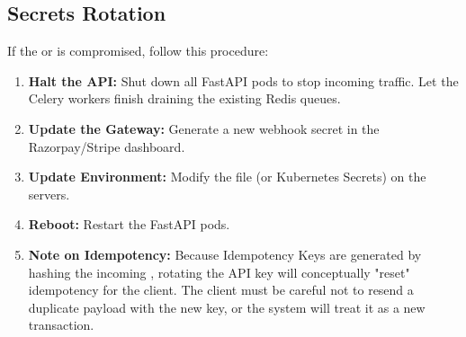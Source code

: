 \vspace{0.8cm}

\subsection{Secrets Rotation}

If the  or  is compromised, follow this procedure:
\begin{enumerate}
    \item \textbf{Halt the API:} Shut down all FastAPI pods to stop incoming traffic. Let the Celery workers finish draining the existing Redis queues.
    \item \textbf{Update the Gateway:} Generate a new webhook secret in the Razorpay/Stripe dashboard.
    \item \textbf{Update Environment:} Modify the  file (or Kubernetes Secrets) on the servers.
    \item \textbf{Reboot:} Restart the FastAPI pods.
    \item \textbf{Note on Idempotency:} Because Idempotency Keys are generated by hashing the incoming , rotating the API key will conceptually "reset" idempotency for the client. The client must be careful not to resend a duplicate payload with the new key, or the system will treat it as a new transaction.
\end{enumerate}
